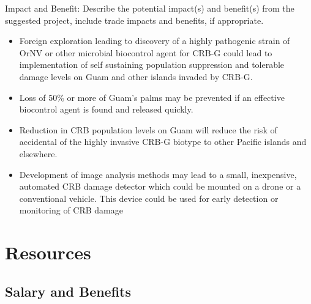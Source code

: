 \documentclass[14pt,english,letterpaper]{scrartcl}
\begin{document}
Impact and Benefit:
Describe the potential impact(s) and benefit(s) from the suggested project, include trade
impacts and benefits, if appropriate.
\begin{itemize}
\item Foreign exploration leading to discovery of a highly pathogenic strain of OrNV or other microbial
biocontrol agent for CRB-G could lead to implementation of self sustaining population
suppression and tolerable damage levels on Guam and other islands invaded by CRB-G.
\item Loss of 50\% or more of Guam’s palms may be prevented if an effective biocontrol agent is found
and released quickly.
\item Reduction in CRB population levels on Guam will reduce the risk of accidental of the highly
invasive CRB-G biotype to other Pacific islands and elsewhere.
\item Development of image analysis methods may lead to a small, inexpensive, automated CRB
damage detector which could be mounted on a drone or a conventional vehicle. This
device could be used for early detection or monitoring of CRB damage
\end{itemize}

\section{Resources} 


\subsection{Salary and Benefits} 

%
%
%
%
%
\end{document}
